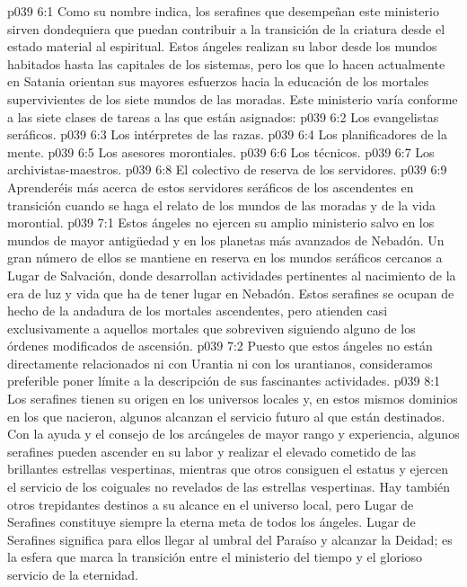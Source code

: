 \vs p039 6:1 Como su nombre indica, los serafines que desempeñan este ministerio sirven dondequiera que puedan contribuir a la transición de la criatura desde el estado material al espiritual. Estos ángeles realizan su labor desde los mundos habitados hasta las capitales de los sistemas, pero los que lo hacen actualmente en Satania orientan sus mayores esfuerzos hacia la educación de los mortales supervivientes de los siete mundos de las moradas. Este ministerio varía conforme a las siete clases de tareas a las que están asignados:
\vs p039 6:2 Los evangelistas seráficos.
\vs p039 6:3 Los intérpretes de las razas.
\vs p039 6:4 Los planificadores de la mente.
\vs p039 6:5 Los asesores morontiales.
\vs p039 6:6 Los técnicos.
\vs p039 6:7 Los archivistas\hyp{}maestros.
\vs p039 6:8 El colectivo de reserva de los servidores.
\vs p039 6:9 \pc Aprenderéis más acerca de estos servidores seráficos de los ascendentes en transición cuando se haga el relato de los mundos de las moradas y de la vida morontial.
\vs p039 7:1 Estos ángeles no ejercen su amplio ministerio salvo en los mundos de mayor antigüedad y en los planetas más avanzados de Nebadón. Un gran número de ellos se mantiene en reserva en los mundos seráficos cercanos a Lugar de Salvación, donde desarrollan actividades pertinentes al nacimiento de la era de luz y vida que ha de tener lugar en Nebadón. Estos serafines se ocupan de hecho de la andadura de los mortales ascendentes, pero atienden casi exclusivamente a aquellos mortales que sobreviven siguiendo alguno de los órdenes modificados de ascensión.
\vs p039 7:2 Puesto que estos ángeles no están directamente relacionados ni con Urantia ni con los urantianos, consideramos preferible poner límite a la descripción de sus fascinantes actividades.
\vs p039 8:1 Los serafines tienen su origen en los universos locales y, en estos mismos dominios en los que nacieron, algunos alcanzan el servicio futuro al que están destinados. Con la ayuda y el consejo de los arcángeles de mayor rango y experiencia, algunos serafines pueden ascender en su labor y realizar el elevado cometido de las brillantes estrellas vespertinas, mientras que otros consiguen el estatus y ejercen el servicio de los coiguales no revelados de las estrellas vespertinas. Hay también otros trepidantes destinos a su alcance en el universo local, pero Lugar de Serafines constituye siempre la eterna meta de todos los ángeles. Lugar de Serafines significa para ellos llegar al umbral del Paraíso y alcanzar la Deidad; es la esfera que marca la transición entre el ministerio del tiempo y el glorioso servicio de la eternidad.
